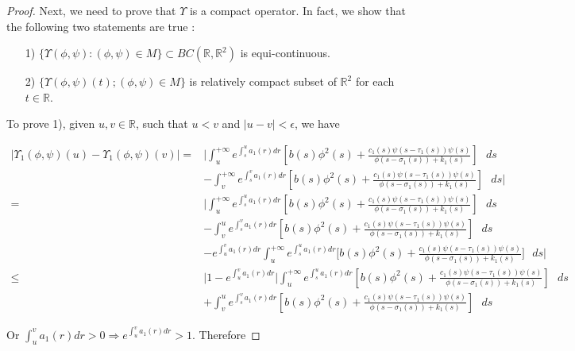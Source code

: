 \documentclass[[a4paper,10pt]{article}
\newcommand{\R}{\mathbb{R}}
\begin{document}
\begin{proof}
Next, we need to prove that $\Upsilon$ is a compact operator.
In fact,  we show that the following two statements are true : \begin{enumerate}
\item[1)]   $\{\Upsilon(\phi,\psi):  (\phi,\psi)\in M\}\subset BC(\R,\R^2)$ is equi-continuous.
\item[2)]$\{\Upsilon(\phi,\psi)(t); (\phi,\psi)\in M\}$ is relatively compact subset of $\R^2$ for each $t\in \R$.\end{enumerate}

To prove 1), given $u,v\in \R$, such that $u<v$ and $|u-v| < \epsilon$, we have

\begin{align*}
\bigg|\Upsilon_1(\phi,\psi)(u)-\Upsilon_1(\phi,\psi)(v)\bigg|=&\bigg|{\displaystyle{\int_u^{+\infty} e^{\int^u_s a_1(r)dr}}}\left[b(s) \phi^2(s)+\frac{c_1(s)\psi(s-\tau_1(s))\psi(s)}{\phi(s-\sigma_1(s))+k_1(s)}\right]\text{ } ds\\
&{\displaystyle{-\int_v^{+\infty} e^{\int^v_s a_1(r)dr}}}\left[b(s) \phi^2(s)+\frac{c_1(s)\psi(s-\tau_1(s))\psi(s)}{\phi(s-\sigma_1(s))+k_1(s)}\right]\text{ } ds\bigg|\\
 =&\bigg|{\displaystyle{\int_u^{+\infty} e^{\int^u_s a_1(r)dr}}}\left[b(s) \phi^2(s)+\frac{c_1(s)\psi(s-\tau_1(s))\psi(s)}{\phi(s-\sigma_1(s))+k_1(s)}\right]\text{ } ds\\
&{\displaystyle{-\int_v^{u} e^{\int^v_s a_1(r)dr}}}\left[b(s) \phi^2(s)+\frac{c_1(s)\psi(s-\tau_1(s))\psi(s)}{\phi(s-\sigma_1(s))+k_1(s)}\right]\text{ } ds\\
 &{\displaystyle{-e^{\int^v_u a_1(r)dr}\int_u^{+\infty} e^{\int^u_s a_1(r)dr}}}\bigg[b(s) \phi^2(s)+\frac{c_1(s)\psi(s-\tau_1(s))\psi(s)}{\phi(s-\sigma_1(s))+k_1(s)}\bigg]\text{ } ds\bigg|\\
 \leq&{\bigg|1-e^{\int^v_u a_1(r)dr}\bigg|\displaystyle{\int_u^{+\infty} e^{\int^u_s a_1(r)dr}}}\left[b(s) \phi^2(s)+\frac{c_1(s)\psi(s-\tau_1(s))\psi(s)}{\phi(s-\sigma_1(s))+k_1(s)}\right]\text{ } ds\\
&{\displaystyle{+\int_v^{u} e^{\int^v_s a_1(r)dr}}}\left[b(s) \phi^2(s)+\frac{c_1(s)\psi(s-\tau_1(s))\psi(s)}{\phi(s-\sigma_1(s))+k_1(s)}\right]\text{ } ds
\end{align*}

Or $\int^v_u a_1(r)dr>0 \Rightarrow e^{\int^v_u a_1(r)dr}>1$. Therefore


\end{proof}
\end{document}
